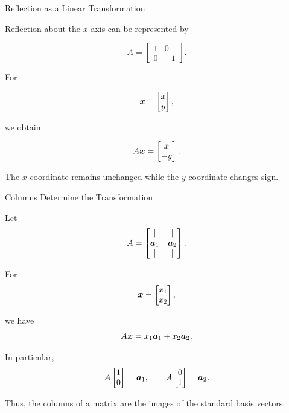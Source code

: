 \begin{frame}{Reflection as a Linear Transformation}

Reflection about the $x$-axis can be represented by

\[
\boxed{
A=
\begin{bmatrix}
1&0\\
0&-1
\end{bmatrix}.
}
\]

For

\[
\bm{x}
=
\begin{bmatrix}
x\\
y
\end{bmatrix},
\]

we obtain

\[
A\bm{x}
=
\begin{bmatrix}
x\\
-y
\end{bmatrix}.
\]

\vspace{0.4cm}

The $x$-coordinate remains unchanged while the
$y$-coordinate changes sign.

\end{frame}



\begin{frame}{Columns Determine the Transformation}

Let
\vspace{-0.1cm}
\[
A=
\begin{bmatrix}
|&|\\
\bm{a}_1&\bm{a}_2\\
|&|
\end{bmatrix}.
\]

For
\vspace{-0.1cm}
\[
\bm{x}
=
\begin{bmatrix}
x_1\\
x_2
\end{bmatrix},
\]

we have
\vspace{-0.1cm}
\[
A\bm{x}
=
x_1\bm{a}_1+x_2\bm{a}_2.
\]

In particular,
\vspace{-0.1cm}
\[
A
\begin{bmatrix}
1\\
0
\end{bmatrix}
=
\bm{a}_1,
\qquad
A
\begin{bmatrix}
0\\
1
\end{bmatrix}
=
\bm{a}_2.
\]

Thus, the columns of a matrix are the images of the
standard basis vectors.

\end{frame}


